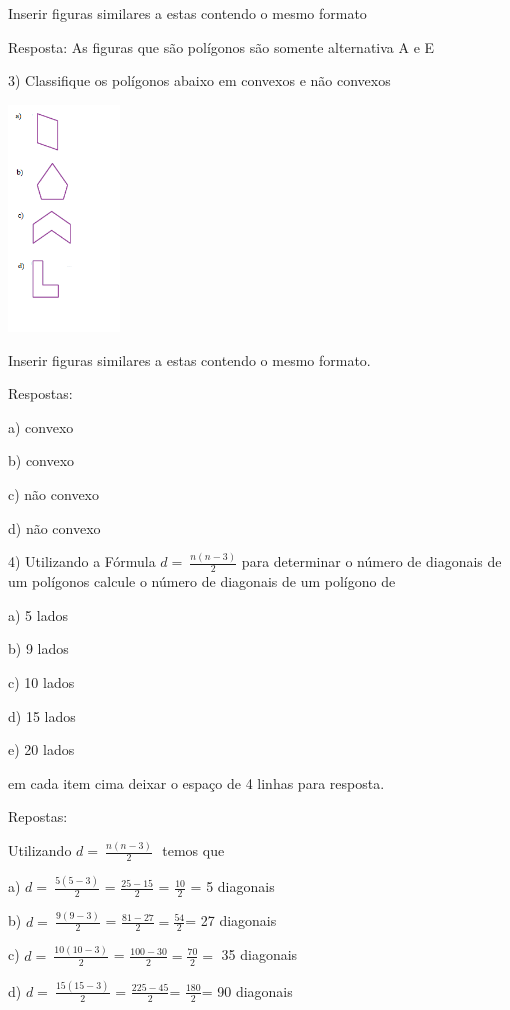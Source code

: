 Inserir figuras similares a estas contendo o mesmo formato

Resposta: As figuras que são polígonos são somente alternativa A e E

3) Classifique os polígonos abaixo em convexos e não convexos

\includegraphics[width=1.16236in,height=2.36667in]{./imgSAEB_8_MAT/media/image8.png}

Inserir figuras similares a estas contendo o mesmo formato.

Respostas:

a) convexo

b) convexo

c) não convexo

d) não convexo

4) Utilizando a Fórmula \(d = \ \frac{n(n - 3)}{2}\) para determinar o
número de diagonais de um polígonos calcule o número de diagonais de um
polígono de

a) 5 lados

b) 9 lados

c) 10 lados

d) 15 lados

e) 20 lados

em cada item cima deixar o espaço de 4 linhas para resposta.

Repostas:

Utilizando \(d = \ \frac{n(n - 3)}{2}\text{\ \ }\)temos que

a) \(d = \ \frac{5(5 - 3)}{2}\) = \(\frac{25 - 15}{2}\) =
\(\frac{10}{2}\) = 5 diagonais

b) \(d = \ \frac{9(9 - 3)}{2}\) = \(\frac{81 - 27}{2} = \frac{54}{2}\)=
27 diagonais

c) \(d = \ \frac{10(10 - 3)}{2}\) =
\(\frac{100 - 30}{2} = \frac{70}{2} =\) 35 diagonais

d) \(d = \ \frac{15(15 - 3)}{2}\) = \(\frac{225 - 45}{2}\)=
\(\frac{180}{2}\)= 90 diagonais

